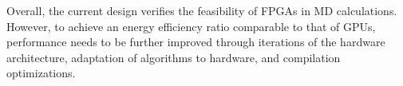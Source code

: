 \documentclass{article}
\begin{document}
Overall, the current design verifies the feasibility of FPGAs in MD 
calculations. 
However, to achieve an energy efficiency ratio comparable to that of GPUs, 
performance needs to be further improved through iterations of the hardware 
architecture, adaptation of algorithms to hardware, and compilation 
optimizations. 





\clearpage
%



\end{document}
